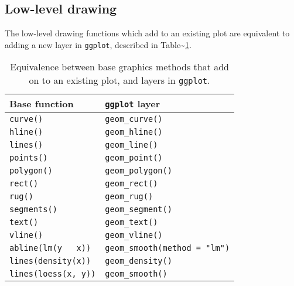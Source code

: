 \subsection{Low-level drawing}

The low-level drawing functions which add to an existing plot are
equivalent to adding a new layer in \texttt{ggplot}, described in
Table\textasciitilde{}\ref{tbl:base-equiv}.

\begin{table}
  \begin{center}
    \begin{tabular}{ll}
      \toprule
      Base function & \texttt{ggplot} layer \\
      \midrule
      \texttt{curve()}    & \texttt{geom\_curve()}      \\
      \texttt{hline()}    & \texttt{geom\_hline()}      \\
      \texttt{lines()}    & \texttt{geom\_line()}       \\
      \texttt{points()}   & \texttt{geom\_point()}      \\
      \texttt{polygon()}  & \texttt{geom\_polygon()}    \\
      \texttt{rect()}     & \texttt{geom\_rect()}       \\
      \texttt{rug()}      & \texttt{geom\_rug()}        \\
      \texttt{segments()} & \texttt{geom\_segment()}    \\
      \texttt{text()}     & \texttt{geom\_text()}       \\
      \texttt{vline()}    & \texttt{geom\_vline()}      \\
      \texttt{abline(lm(y ~ x))}  & \texttt{geom\_smooth(method = "lm")}  \\
      \texttt{lines(density(x))}  & \texttt{geom\_density()}         \\
      \texttt{lines(loess(x, y))} & \texttt{geom\_smooth()}          \\
      \bottomrule
    \end{tabular}
  \end{center}
  \caption{Equivalence between base graphics methods that add on to an existing plot, and layers in \texttt{ggplot}.}
  \label{tbl:base-equiv}
\end{table}

\begin{Shaded}
\begin{Highlighting}[]

\StringTok{ }\NormalTok{()}

\NormalTok{() +}\StringTok{ }\NormalTok{()}
\end{Highlighting}
\end{Shaded}

